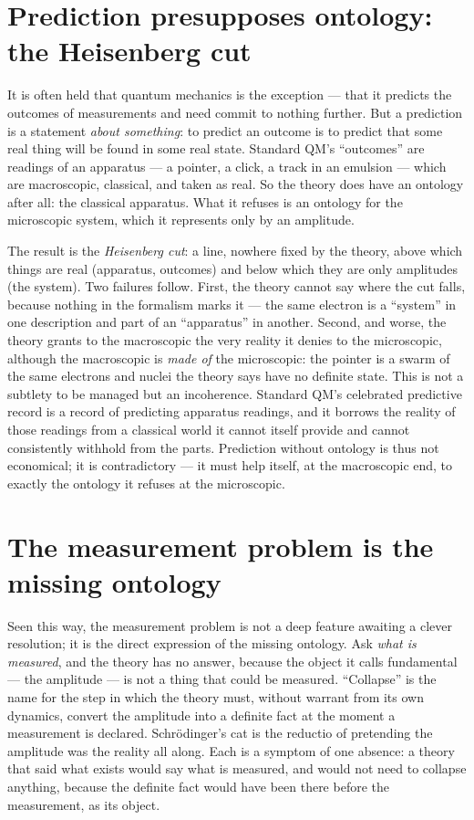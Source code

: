 \documentclass[11pt]{article}
\begin{document}
\section{Prediction presupposes ontology: the Heisenberg cut}

It is often held that quantum mechanics is the exception --- that it predicts the outcomes of measurements and
need commit to nothing further. But a prediction is a statement \emph{about something}: to predict an outcome
is to predict that some real thing will be found in some real state. Standard QM's ``outcomes'' are readings
of an apparatus --- a pointer, a click, a track in an emulsion --- which are macroscopic, classical, and
taken as real. So the theory does have an ontology after all: the classical apparatus. What it refuses is an
ontology for the microscopic system, which it represents only by an amplitude.

The result is the \emph{Heisenberg cut}: a line, nowhere fixed by the theory, above which things are real
(apparatus, outcomes) and below which they are only amplitudes (the system). Two failures follow. First, the
theory cannot say where the cut falls, because nothing in the formalism marks it --- the same electron is a
``system'' in one description and part of an ``apparatus'' in another. Second, and worse, the theory grants to
the macroscopic the very reality it denies to the microscopic, although the macroscopic is \emph{made of} the
microscopic: the pointer is a swarm of the same electrons and nuclei the theory says have no definite state.
This is not a subtlety to be managed but an incoherence. Standard QM's celebrated predictive record is a
record of predicting apparatus readings, and it borrows the reality of those readings from a classical world
it cannot itself provide and cannot consistently withhold from the parts. Prediction without ontology is thus
not economical; it is contradictory --- it must help itself, at the macroscopic end, to exactly the ontology
it refuses at the microscopic.

\section{The measurement problem is the missing ontology}

Seen this way, the measurement problem is not a deep feature awaiting a clever resolution; it is the direct
expression of the missing ontology. Ask \emph{what is measured}, and the theory has no answer, because the
object it calls fundamental --- the amplitude --- is not a thing that could be measured. ``Collapse'' is the
name for the step in which the theory must, without warrant from its own dynamics, convert the amplitude into a
definite fact at the moment a measurement is declared. Schr\"odinger's cat is the reductio of pretending the
amplitude was the reality all along. Each is a symptom of one absence: a theory that said what exists would
say what is measured, and would not need to collapse anything, because the definite fact would have been there
before the measurement, as its object.
\end{document}

